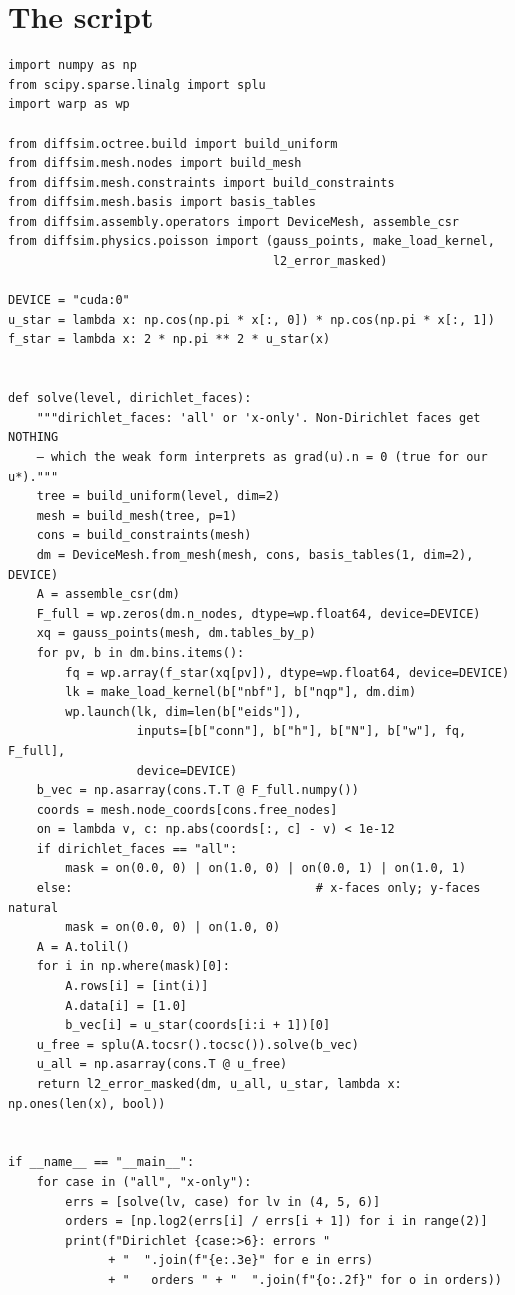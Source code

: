 \section*{The script}
\begin{lstlisting}
import numpy as np
from scipy.sparse.linalg import splu
import warp as wp

from diffsim.octree.build import build_uniform
from diffsim.mesh.nodes import build_mesh
from diffsim.mesh.constraints import build_constraints
from diffsim.mesh.basis import basis_tables
from diffsim.assembly.operators import DeviceMesh, assemble_csr
from diffsim.physics.poisson import (gauss_points, make_load_kernel,
                                     l2_error_masked)

DEVICE = "cuda:0"
u_star = lambda x: np.cos(np.pi * x[:, 0]) * np.cos(np.pi * x[:, 1])
f_star = lambda x: 2 * np.pi ** 2 * u_star(x)


def solve(level, dirichlet_faces):
    """dirichlet_faces: 'all' or 'x-only'. Non-Dirichlet faces get NOTHING
    — which the weak form interprets as grad(u).n = 0 (true for our u*)."""
    tree = build_uniform(level, dim=2)
    mesh = build_mesh(tree, p=1)
    cons = build_constraints(mesh)
    dm = DeviceMesh.from_mesh(mesh, cons, basis_tables(1, dim=2), DEVICE)
    A = assemble_csr(dm)
    F_full = wp.zeros(dm.n_nodes, dtype=wp.float64, device=DEVICE)
    xq = gauss_points(mesh, dm.tables_by_p)
    for pv, b in dm.bins.items():
        fq = wp.array(f_star(xq[pv]), dtype=wp.float64, device=DEVICE)
        lk = make_load_kernel(b["nbf"], b["nqp"], dm.dim)
        wp.launch(lk, dim=len(b["eids"]),
                  inputs=[b["conn"], b["h"], b["N"], b["w"], fq, F_full],
                  device=DEVICE)
    b_vec = np.asarray(cons.T.T @ F_full.numpy())
    coords = mesh.node_coords[cons.free_nodes]
    on = lambda v, c: np.abs(coords[:, c] - v) < 1e-12
    if dirichlet_faces == "all":
        mask = on(0.0, 0) | on(1.0, 0) | on(0.0, 1) | on(1.0, 1)
    else:                                  # x-faces only; y-faces natural
        mask = on(0.0, 0) | on(1.0, 0)
    A = A.tolil()
    for i in np.where(mask)[0]:
        A.rows[i] = [int(i)]
        A.data[i] = [1.0]
        b_vec[i] = u_star(coords[i:i + 1])[0]
    u_free = splu(A.tocsr().tocsc()).solve(b_vec)
    u_all = np.asarray(cons.T @ u_free)
    return l2_error_masked(dm, u_all, u_star, lambda x: np.ones(len(x), bool))


if __name__ == "__main__":
    for case in ("all", "x-only"):
        errs = [solve(lv, case) for lv in (4, 5, 6)]
        orders = [np.log2(errs[i] / errs[i + 1]) for i in range(2)]
        print(f"Dirichlet {case:>6}: errors "
              + "  ".join(f"{e:.3e}" for e in errs)
              + "   orders " + "  ".join(f"{o:.2f}" for o in orders))
\end{lstlisting}


